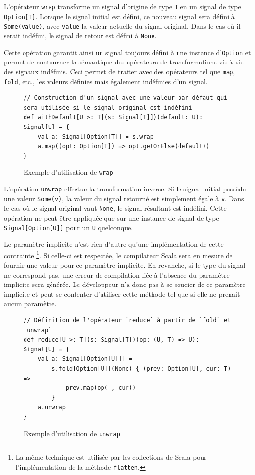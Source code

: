 L'opérateur \texttt{wrap} transforme un signal d'origine de type \texttt{T} en un signal de type \texttt{Option[T]}. Lorsque le signal initial est défini, ce nouveau signal sera défini à \texttt{Some(value)}, avec \texttt{value} la valeur actuelle du signal original. Dans le cas où il serait indéfini, le signal de retour est défini à \texttt{None}.

Cette opération garantit ainsi un signal toujours défini à une instance d'\texttt{Option} et permet de contourner la sémantique des opérateurs de transformations vis-à-vis des signaux indéfinis. Ceci permet de traiter avec des opérateurs tel que \texttt{map}, \texttt{fold}, etc., les valeurs définies mais également indéfinies d'un signal.

\begin{figure}[h]
	\begin{lstlisting}
// Construction d'un signal avec une valeur par défaut qui sera utilisée si le signal original est indéfini
def withDefault[U >: T](s: Signal[T]])(default: U): Signal[U] = {
	val a: Signal[Option[T]] = s.wrap
	a.map((opt: Option[T]) => opt.getOrElse(default))
}
	\end{lstlisting}
	\caption{Exemple d'utilisation de \texttt{wrap}}
\end{figure}

L'opération \texttt{unwrap} effectue la transformation inverse. Si le signal initial possède une valeur \texttt{Some(v)}, la valeur du signal retourné est simplement égale à \texttt{v}. Dans le cas où le signal original vaut \texttt{None}, le signal résultant est indéfini. Cette opération ne peut être appliquée que sur une instance de signal de type \texttt{Signal[Option[U]]} pour un \texttt{U} quelconque.

Le paramètre implicite n'est rien d'autre qu'une implémentation de cette contrainte \footnote{La même technique est utilisée par les collections de Scala pour l'implémentation de la méthode \texttt{flatten}.}. Si celle-ci est respectée, le compilateur Scala sera en mesure de fournir une valeur pour ce paramètre implicite. En revanche, si le type du signal ne correspond pas, une erreur de compilation liée à l'absence du paramètre implicite sera générée. Le développeur n'a donc pas à se soucier de ce paramètre implicite et peut se contenter d'utiliser cette méthode tel que si elle ne prenait aucun paramètre.

\begin{figure}[h]
	\begin{lstlisting}
// Définition de l'opérateur `reduce` à partir de `fold` et `unwrap`
def reduce[U >: T](s: Signal[T])(op: (U, T) => U): Signal[U] = {
	val a: Signal[Option[U]]] =
		s.fold[Option[U]](None) { (prev: Option[U], cur: T) =>
			prev.map(op(_, cur))
		}
	a.unwrap
}
	\end{lstlisting}
	\caption{Exemple d'utilisation de \texttt{unwrap}}
\end{figure}

